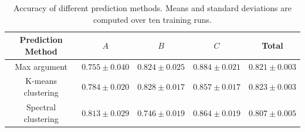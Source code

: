 \documentclass[12pt]{article}
\begin{document}
        \begin{table}[htpb]  
            \centering  
            \caption{Accuracy of different prediction methods. Means and standard deviations are computed over ten training runs.}  
            \label{tab:accuracy_w_different_prediction_dominated_1}  
            \begin{tabular}{c|ccc|c}  
                Prediction Method   & $A$               & $B$               & $C$               & Total             \\ \hline  
                Max argument        & $0.755 \pm 0.040$ & $0.824 \pm 0.025$ & $0.884 \pm 0.021$ & $0.821 \pm 0.003$ \\  
                K-means clustering  & $0.784 \pm 0.020$ & $0.828 \pm 0.017$ & $0.857 \pm 0.017$ & $0.823 \pm 0.003$ \\  
                Spectral clustering & $0.813 \pm 0.029$ & $0.746 \pm 0.019$ & $0.864 \pm 0.019$ & $0.807 \pm 0.005$  
            \end{tabular}  
        \end{table}  
\end{document}
